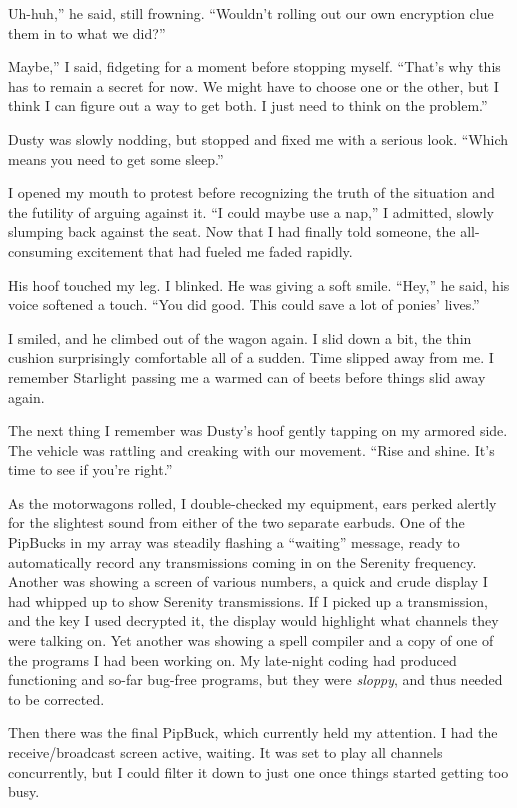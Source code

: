 \leavevmode{}Uh-huh,” he said, still frowning. “Wouldn’t rolling out our own encryption clue them in to what we did?”

\leavevmode{}Maybe,” I said, fidgeting for a moment before stopping myself. “That’s why this has to remain a secret for now. We might have to choose one or the other, but I think I can figure out a way to get both. I just need to think on the problem.”

Dusty was slowly nodding, but stopped and fixed me with a serious look. “Which means you need to get some sleep.”

I opened my mouth to protest before recognizing the truth of the situation and the futility of arguing against it. “I could maybe use a nap,” I admitted, slowly slumping back against the seat. Now that I had finally told someone, the all-consuming excitement that had fueled me faded rapidly.

His hoof touched my leg. I blinked. He was giving a soft smile. “Hey,” he said, his voice softened a touch. “You did good. This could save a lot of ponies’ lives.”

I smiled, and he climbed out of the wagon again. I slid down a bit, the thin cushion surprisingly comfortable all of a sudden. Time slipped away from me. I remember Starlight passing me a warmed can of beets before things slid away again.

The next thing I remember was Dusty’s hoof gently tapping on my armored side. The vehicle was rattling and creaking with our movement. “Rise and shine. It’s time to see if you’re right.”

{\br}%
As the motorwagons rolled, I double-checked my equipment, ears perked alertly for the slightest sound from either of the two separate earbuds. One of the PipBucks in my array was steadily flashing a “waiting” message, ready to automatically record any transmissions coming in on the Serenity frequency. Another was showing a screen of various numbers, a quick and crude display I had whipped up to show Serenity transmissions. If I picked up a transmission, and the key I used decrypted it, the display would highlight what channels they were talking on. Yet another was showing a spell compiler and a copy of one of the programs I had been working on. My late-night coding had produced functioning and so-far bug-free programs, but they were \textit{sloppy}, and thus needed to be corrected.

Then there was the final PipBuck, which currently held my attention. I had the receive/broadcast screen active, waiting. It was set to play all channels concurrently, but I could filter it down to just one once things started getting too busy.

